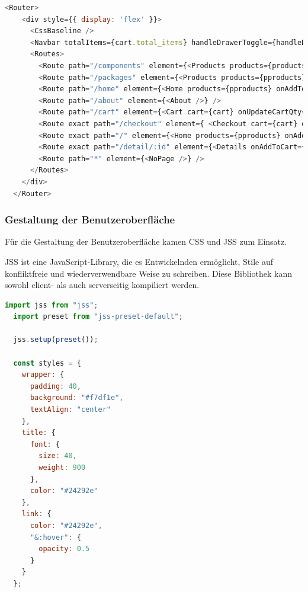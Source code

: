 \begin{lstlisting}[language=JavaScript, caption=Source-Code des Routers, label=lst:impl:reactRouterSourceCode]
  <Router>
    <div style={{ display: 'flex' }}>
      <CssBaseline />
      <Navbar totalItems={cart.total_items} handleDrawerToggle={handleDrawerToggle} />
      <Routes>
        <Route path="/components" element={<Products products={products} onAddToCart={handleAddToCart} handleUpdateCartQty />} />
        <Route path="/packages" element={<Products products={pproducts} onAddToCart={handleAddToCart} handleUpdateCartQty />} />
        <Route path="/home" element={<Home products={pproducts} onAddToCart={handleAddToCart} handleUpdateCartQty/>} />
        <Route path="/about" element={<About />} />
        <Route path="/cart" element={<Cart cart={cart} onUpdateCartQty={handleUpdateCartQty} onRemoveFromCart={handleRemoveFromCart} onEmptyCart={handleEmptyCart} /> } />
        <Route exact path="/checkout" element={ <Checkout cart={cart} order={order} onCaptureCheckout={handleCaptureCheckout} error={errorMessage} /> } />
        <Route exact path="/" element={<Home products={pproducts} onAddToCart={handleAddToCart} handleUpdateCartQty/>} />
        <Route exact path="/detail/:id" element={<Details onAddToCart={handleAddToCart} handleUpdateCartQty />} />
        <Route path="*" element={<NoPage />} />
      </Routes>
    </div>
  </Router> 
\end{lstlisting}

\subsubsection{Gestaltung der Benutzeroberfläche}

Für die Gestaltung der Benutzeroberfläche kamen CSS und JSS zum Einsatz.

JSS ist eine JavaScript-Library, die es Entwickelnden ermöglicht, Stile auf konfliktfreie und wiederverwendbare Weise zu schreiben. Diese Bibliothek kann sowohl client- als auch serverseitig kompiliert werden. 
\cite{jss}

\begin{lstlisting}[language=JavaScript, caption=Beispiel Source-Code für die Verwendung von JSS, label=lst:impl:bspJSS]
  import jss from "jss";
  import preset from "jss-preset-default";
  
  jss.setup(preset());
  
  const styles = {
    wrapper: {
      padding: 40,
      background: "#f7df1e",
      textAlign: "center"
    },
    title: {
      font: {
        size: 40,
        weight: 900
      },
      color: "#24292e"
    },
    link: {
      color: "#24292e",
      "&:hover": {
        opacity: 0.5
      }
    }
  };
\end{lstlisting} \cite{jssExample}

